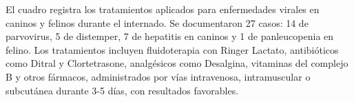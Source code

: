 \begin{landscape}
\begin{longtable}
	\end{longtable}
	\vspace{-12pt}\normalsize
	El cuadro registra los tratamientos aplicados para enfermedades virales en caninos y felinos durante el internado. Se documentaron 27 casos: 14 de parvovirus, 5 de distemper, 7 de hepatitis en caninos y 1 de panleucopenia en felino. Los tratamientos incluyen fluidoterapia con Ringer Lactato, antibióticos como Ditral y Clortetrasone, analgésicos como Desalgina, vitaminas del complejo B y otros fármacos, administrados por vías intravenosa, intramuscular o subcutánea durante 3-5 días, con resultados favorables.

\end{landscape}
